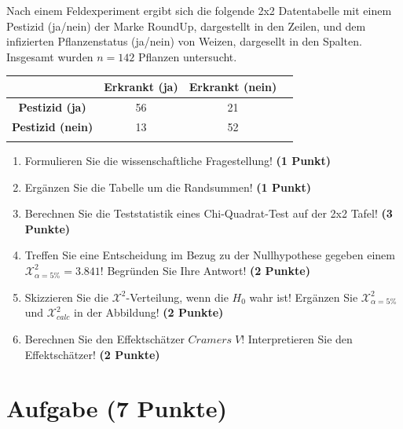 \documentclass[a4paper, 9pt]{scrartcl}\usepackage[]{graphicx}\usepackage[]{xcolor}
\begin{document}
Nach einem Feldexperiment ergibt sich die folgende 2x2 Datentabelle mit einem
Pestizid (ja/nein) der Marke RoundUp, dargestellt in den Zeilen, und
dem infizierten Pflanzenstatus (ja/nein) von Weizen, dargesellt in
den Spalten. Insgesamt wurden $n = 142$ Pflanzen untersucht.
\vspace{5Ex}

\begin{center}
  \Large
  \begin{tabular}{c|c|c|c}
     & \textbf{Erkrankt (ja)} & \textbf{Erkrankt (nein)} &  \strut\\
    \hline
    \textbf{Pestizid (ja)} & 56  & 21  &     \strut\\
    \hline
    \textbf{Pestizid (nein)} & 13  & 52  &      \strut\\
    \hline
     \phantom{100} & \phantom{100}  & \phantom{100}  &  \phantom{100}  \strut\\
  \end{tabular}
\end{center}

\vspace{5Ex}

\begin{enumerate}
\item Formulieren Sie die wissenschaftliche Fragestellung! \textbf{(1 Punkt)}
\item Erg{\"a}nzen Sie die Tabelle um die Randsummen! \textbf{(1 Punkt)} 
\item Berechnen Sie die Teststatistik eines Chi-Quadrat-Test auf der 2x2
  Tafel! \textbf{(3 Punkte)}
\item Treffen Sie eine Entscheidung im Bezug zu der Nullhypothese gegeben
  einem $\mathcal{X}^2_{\alpha = 5\%} = 3.841$! Begr{\"u}nden Sie Ihre Antwort!
  \textbf{(2 Punkte)}
\item Skizzieren Sie die $\mathcal{X}^2$-Verteilung, wenn die $H_0$ wahr
  ist! Erg{\"a}nzen Sie  $\mathcal{X}^2_{\alpha = 5\%}$ und
  $\mathcal{X}^2_{calc}$ in der Abbildung! \textbf{(2 Punkte)}
\item Berechnen Sie den Effektsch{\"a}tzer $Cramers\; V$! Interpretieren Sie den
  Effektsch{\"a}tzer! \textbf{(2 Punkte)}
\end{enumerate} 
\clearpage

\section{Aufgabe \hfill (7 Punkte)}
\end{document}
